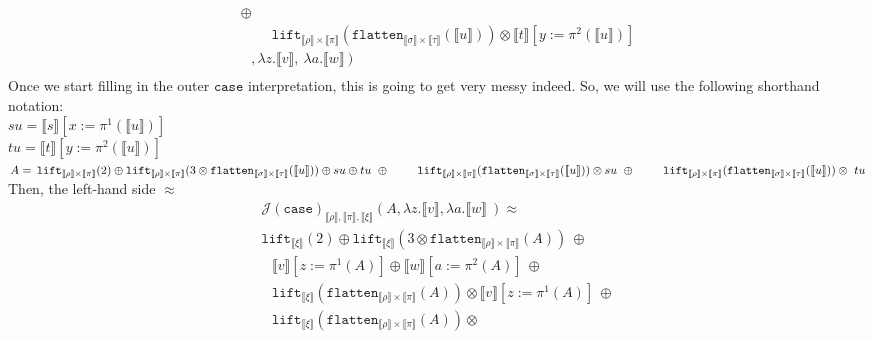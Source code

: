 \documentclass[a4paper,UKenglish,cleveref,autoref,numberwithinsect]{lipics-v2019}
\theoremstyle{definition}
\newcommand{\abs}[2]{\lambda #1.#2}
\newcommand{\flatten}{\mathtt{flatten}}
\newcommand{\lift}{\mathtt{lift}}
\newcommand{\typeinterpret}[1]{\llbracket #1 \rrbracket}
\newcommand{\interpret}[1]{\llbracket #1 \rrbracket}
\begin{document}
\begin{itemize}
\[\begin{array}{l}
      \oplus \\
  \phantom{ABC}
    \lift_{\typeinterpret{\rho} \times \typeinterpret{\pi}}(
      \flatten_{\typeinterpret{\sigma} \times \typeinterpret{\tau}}(
      \interpret{u})) \otimes \interpret{t}[y:=\pi^2(\interpret{u})] \\
  \phantom{A}
  , \abs{z}{\interpret{v}},\ \abs{a}{\interpret{w}}\ ) \\
  \end{array}
  \]
  Once we start filling in the outer $\mathtt{case}$ interpretation,
  this is going to get very messy indeed.  So, we will use the
  following shorthand notation: \\
  $su = \interpret{s}[x:=\pi^1(\interpret{u})]$ \\
  $tu = \interpret{t}[y:=\pi^2(\interpret{u})]$ \\
  $A = \,
    \lift_{\typeinterpret{\rho} \times \typeinterpret{\pi}}(2) \oplus
    \lift_{\typeinterpret{\rho} \times \typeinterpret{\pi}}(3 \otimes
      \flatten_{\typeinterpret{\sigma} \times \typeinterpret{\tau}}(
      \interpret{u})) \oplus su \oplus tu\ \oplus \\
  \phantom{ABC}
    \lift_{\typeinterpret{\rho} \times \typeinterpret{\pi}}(
      \flatten_{\typeinterpret{\sigma} \times \typeinterpret{\tau}}(
      \interpret{u})) \otimes su\ \oplus \\
  \phantom{ABC}
    \lift_{\typeinterpret{\rho} \times \typeinterpret{\pi}}(
      \flatten_{\typeinterpret{\sigma} \times \typeinterpret{\tau}}(
      \interpret{u})) \otimes\ tu \\
  $ \\
  Then, the left-hand side $\approx$
  \[
  \begin{array}{l}
  \mathcal{J}(\mathtt{case})_{\typeinterpret{\rho},
    \typeinterpret{\pi},\typeinterpret{\xi}}(A,
      \abs{z}{\interpret{v}}, \abs{a}{\interpret{w}}\ ) \approx \\
  \lift_{\typeinterpret{\xi}}(2) \oplus
    \lift_{\typeinterpret{\xi}}(3 \otimes \flatten_{
    \typeinterpret{\rho} \times \typeinterpret{\pi}}(A))\ \oplus \\
  \phantom{A}
    \interpret{v}[z:=\pi^1(A)] \oplus
    \interpret{w}[a:=\pi^2(A)]\ \oplus\ \\
  \phantom{A}
    \lift_{\typeinterpret{\xi}}(\flatten_{
    \typeinterpret{\rho} \times \typeinterpret{\pi}}(A)) \otimes
    \interpret{v}[z:=\pi^1(A)]\ \oplus \\
  \phantom{A}
    \lift_{\typeinterpret{\xi}}(\flatten_{
    \typeinterpret{\rho} \times \typeinterpret{\pi}}(A)) \otimes

\end{array}\]
\end{itemize}
\end{document}
